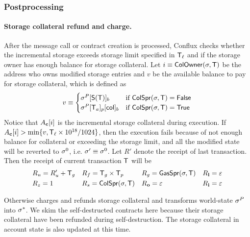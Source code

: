 \subsubsection{Postprocessing}\label{sec:tx_post_process}

\paragraph{Storage collateral refund and charge.}

After the message call or contract creation is processed, Conflux checks whether the incremental storage exceeds storage limit specified in $\textsf{T}_\ell$ and if the storage owner has enough balance for storage collateral. 
Let $i\equiv \mathsf{ColOwner}(\mathbf{\sigma},\textsf{T})$ be the address who owns modified storage entries and $v$ be the available balance to pay for storage collateral, which is defined as 
\begin{align}
	v \equiv \begin{cases}
		\mathbf{\sigma}^{P}[\mathsf{S}{\left({\textsf{T}} \right)}]_b & \text{if }\mathsf{ColSpr}(\mathbf{\sigma},\textsf{T})=\mathsf{False} \\
		\mathbf{\sigma}^{P}[\textsf{T}_a]_p[{\sf col}]_b &  \text{if }\mathsf{ColSpr}(\mathbf{\sigma},\textsf{T})=\mathsf{True}
	\end{cases}
\end{align}
%
Notice that $A_{\bf c}[i]$ is the incremental storage collateral during execution.
If $A_{\bf c}[i]>\min\{v,\textsf{T}_\ell\times 10^{18}/1024\}$, then the execution fails because of not enough balance for collateral or exceeding the storage limit, 
and all the modified state will be reverted to $\mathbf{\sigma}^0$, 
i.e. $\mathbf{\sigma}'\equiv\mathbf{\sigma}^0$. 
Let $R'$ denote the receipt of last transaction.
Then the receipt of current transaction $\textsf{T}$ will be 
\begin{align}
	&R_u=R'_u+\textsf{T}_g && R_f = \textsf{T}_g\times\textsf{T}_p && R_g = \mathsf{GasSpr}(\mathbf{\sigma},\textsf{T}) && R_{\bf l}=\mathbb{\varepsilon} \\
	&R_z=1 && R_s = \mathsf{ColSpr}(\mathbf{\sigma},\textsf{T}) && R_{\bf o}=\mathbb{\varepsilon} && R_{\bf i}=\mathbb{\varepsilon}
\end{align}

Otherwise \name charges and refunds storage collateral and transforms world-state $\mathbf{\sigma}^P$ into $\mathbf{\sigma}^*$. 
We skim the self-destructed contracts here because their storage collateral have been refunded during self-destruction. 
The storage collateral in account state is also updated at this time. 

